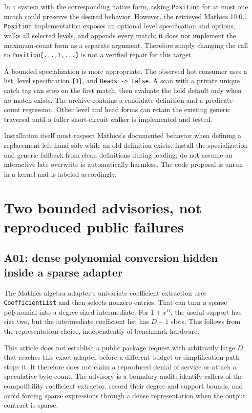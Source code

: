 \documentclass[11pt,letterpaper]{article}
\newcommand{\code}[1]{\texttt{#1}}
\begin{document}
In a system with the corresponding native form, asking \code{Position} for at most one match could preserve the desired behavior. However, the retrieved Mathics 10.0.1 \code{Position} implementation exposes an optional level specification and options, walks all selected levels, and appends every match; it does not implement the maximum-count form as a separate argument. Therefore simply changing the call to \code{Position[...,1,...]} is not a verified repair for this target.~\cite{mathics-position}

A bounded specialization is more appropriate. The observed hot consumer uses a list, level specification \code{\{1\}}, and \code{Heads -> False}. A scan with a private unique catch tag can stop on the first match, then evaluate the held default only when no match exists. The archive contains a candidate definition and a predicate-count regression. Other level and head forms can retain the existing generic traversal until a fuller short-circuit walker is implemented and tested.

Installation itself must respect Mathics's documented behavior when defining a replacement left-hand side while an old definition exists. Install the specialization and generic fallback from clean definitions during loading; do not assume an interactive late overwrite is automatically harmless. The code proposal is unrun in a kernel and is labeled accordingly.

\section{Two bounded advisories, not reproduced public failures}

\subsection{A01: dense polynomial conversion hidden inside a sparse adapter}

The Mathics algebra adapter's univariate coefficient extraction uses \code{CoefficientList} and then selects nonzero entries. That can turn a sparse polynomial into a degree-sized intermediate. For $1+x^D$, the useful support has size two, but the intermediate coefficient list has $D+1$ slots. This follows from the representation choice, independently of benchmark hardware.~\cite{mathics-algebra}

This article does not establish a public package request with arbitrarily large $D$ that reaches this exact adapter before a different budget or simplification path stops it. It therefore does not claim a reproduced denial of service or attach a speculative byte count. The advisory is a boundary audit: identify callers of the compatibility coefficient extractor, record their degree and support bounds, and avoid forcing sparse expressions through a dense representation when the output contract is sparse.
\end{document}
